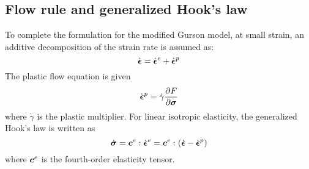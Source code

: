 \subsection{Flow rule and generalized Hook's law}
To complete the formulation for the modified Gurson model, at small
strain, an additive decomposition of the strain rate is assumed as:
\begin{equation}
  \dot{{\boldsymbol{\epsilon}}} = \dot{{\boldsymbol{\epsilon}}}^e + \dot{{\boldsymbol{\epsilon}}}^p
\end{equation}
The plastic flow equation is given
\begin{equation}\label{eq:flow_rule}
  \dot{{\boldsymbol{\epsilon}}}^p = \dot{\gamma}\frac{\partial F}{\partial{\boldsymbol{\sigma}}}
\end{equation}
where $\dot{\gamma}$ is the plastic multiplier. For linear isotropic
elasticity, the generalized Hook's law is written as
\begin{equation}
  \dot{{\boldsymbol{\sigma}}} = {\boldsymbol{c}}^e : \dot{{\boldsymbol{\epsilon}}}^e = {\boldsymbol{c}}^e : (\dot{{\boldsymbol{\epsilon}}} - \dot{{\boldsymbol{\epsilon}}}^p)
\end{equation}
where ${\boldsymbol{c}}^e$ is the fourth-order elasticity tensor.

 
